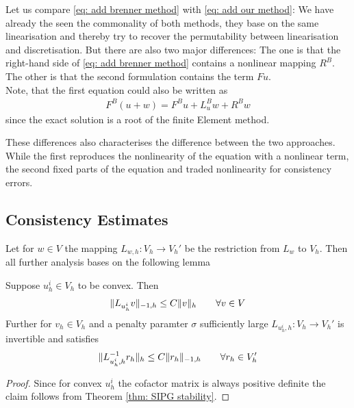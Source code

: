 Let us compare \eqref{eq: add brenner method} with \eqref{eq: add our method}: We have already the seen the commonality of both methods, they base on the same linearisation and thereby try to recover the permutability between linearisation and discretisation. 
But there are also two major differences: The one is that the right-hand side of \eqref{eq: add brenner method} contains a nonlinear mapping $R^B$. The other is that the second formulation contains the term $Fu$. \\
Note, that the first equation could also be written as 
 \begin{align*}
 F^B(u +w ) = F^B u + L^B_u w + R^Bw 
 \end{align*}
since the exact \MA solution is a root of the finite Element method. 

These differences also characterises the difference between the two approaches. 
While the first reproduces the nonlinearity of the \MA equation with a nonlinear term, the second fixed parts of the equation and traded nonlinearity for consistency errors.

\subsection{Consistency Estimates}

Let for $w \in V$ the mapping $L_{w,h}:V_h \rightarrow V_h'$ be the restriction from $L_w$ to $V_h$. Then all further analysis bases on the following lemma
\begin{lemma}[Stability] \label{la: stability L}
	Suppose $u_h^i \in V_h$ to be convex. Then 
	\begin{align}
		\lVert L_{u_h^i}v \rVert_{-1,h} \leq C \lVert v \rVert_{h} \qquad \forall v \in V
	\end{align}
	Further for $v_h \in V_h$ and a penalty paramter $\sigma $ sufficiently large $L_{u^i_h,h}: V_h \rightarrow V_h'$ is invertible and satisfies
	\begin{align}
		\lVert L_{u^i_h,h}^{-1} r_h \rVert_{h} \leq C \lVert r_h \rVert_{-1,h} \qquad \forall r_h \in V_h'
	\end{align}
\end{lemma}
\begin{proof}
	Since for convex $u_h^i$ the cofactor matrix is always positive definite the claim follows from Theorem \ref{thm: SIPG stability}.
\end{proof}

